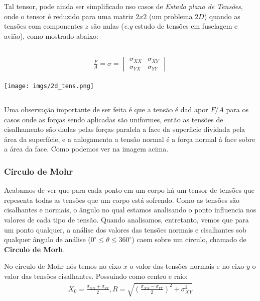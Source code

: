 \documentclass{article}
\begin{document}
Tal tensor, pode ainda ser simplificado nso casos de \emph{Estado plano de Tensões}, onde o tensor é reduzido para uma matriz $2x2$ (um problema $2D$) quando as tensões com componentes $z$ são nulas (\emph{e.g} estudo de tensões em fuselagem e avião), como mostrado abaixo:

$$$$
\begin{minipage}{.5\textwidth}
    \begin{align*}
        \frac{F}{A} = \sigma = \begin{vmatrix}
                                   \sigma_{XX} & \sigma_{XY} \\
                                   \sigma_{YX} & \sigma_{YY}
                               \end{vmatrix}
    \end{align*}
\end{minipage}
\begin{minipage}{.5\textwidth}
    \texttt{[image: imgs/2d\_tens.png]}
\end{minipage}
$$$$

Uma observação importante de ser feita é que a tensão é dad apor $F/A$ para os casos onde as forças sendo aplicadas são uniformes, então as tensões de cisalhamento são dadas pelas forças paralela a face da superficie dividada pela área da superfície, e a anlogamenta a tensão normal é a força normal à face sobre a área da face. Como podemos ver na imagem acima.

\newpage
\subsubsection*{Círculo de Mohr}
Acabamos de ver que para cada ponto em um corpo há um tensor de tensões que repesenta todas as tensões que um corpo está sofrendo. Como as tensões são cisalhantes e normais, o ângulo no qual estamos analisando o ponto influencia nos valores de cada tipo de tensão. Quando analisamos, entretanto, vemos que para um ponto qualquer, a análise dos valores das tensões normais e cisalhantes sob qualquer ângulo de análise ($0^\circ \le \theta \le 360^\circ $) caem sobre um circulo, chamado de \textbf{Circulo de Morh}.

No círculo de Mohr nós temos no eixo $x$ o valor das tensões normais e no eixo $y$ o valor das tensões cisalhantes. Possuindo como centro e raio:
\begin{align*}
    X_0 = \frac{\sigma_{XX} + \sigma_{YY}}{2}, R = \sqrt{\left(\frac{\sigma_{XX} - \sigma_{YY}}{2}\right)^2 + \sigma^2_{XY}}
\end{align*}
\end{document}
